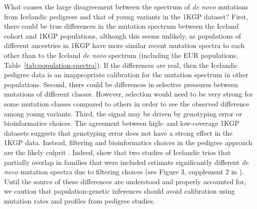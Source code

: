 \documentclass[]{article}
\begin{document}
What causes the large disagreement between the spectrum of \emph{de novo}
mutations from Icelandic pedigrees and that of young variants in the 1KGP
dataset? First, there could be true differences in the mutation spectrum
between the Iceland cohort and 1KGP populations, although this seems unlikely,
as populations of different ancestries in 1KGP have more similar recent
mutation spectra to each other than to the Iceland \emph{de novo} spectrum
(including the EUR populations, Table~\ref{tab:population-spectra}). If the
differences are real, then the Icelandic pedigree data is an inappropriate
calibration for the mutation spectrum in other populations. Second, there could
be differences in selective pressures between mutations of different classes.
However, selection would need to be very strong for some mutation classes
compared to others in order to see the observed difference among young
variants. Third, the signal may be driven by genotyping error or bioinformatics
choices. The agreement between high- and low-coverage 1KGP datasets suggests
that genotyping error does not have a strong effect in the 1KGP data. Instead,
filtering and bioinformatics choices in the pedigree approach are the likely
culprit \citep{bergeron2022mutationathon}. Indeed, \citet{gao2023limited} show
that two studies of Icelandic trios that partially overlap in families that
were included \citep{jonsson2017parental,halldorsson2019characterizing}
estimate significantly different \emph{de novo} mutation spectra due to
filtering choices (see Figure 3, supplement 2 in \citeauthor{gao2023limited}).
Until the source of these differences are understood and properly accounted
for, we caution that population-genetic inferences should avoid calibration
using mutation rates and profiles from pedigree studies.
\end{document}
